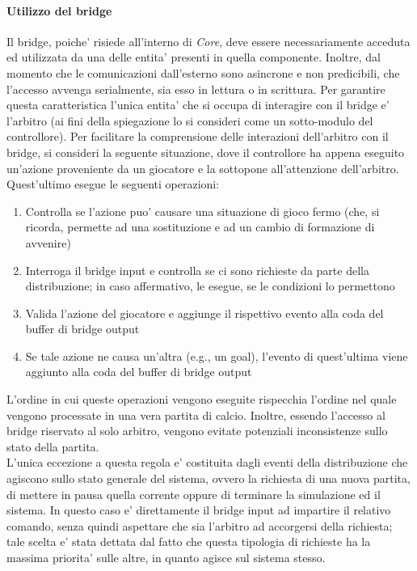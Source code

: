 \paragraph{Utilizzo del bridge}\label{sec:analisi_distribuzione_bridge_utilizzo} Il bridge, poiche' risiede all'interno di \textit{Core}, deve essere necessariamente acceduta ed utilizzata da una delle entita' presenti in quella componente. Inoltre, dal momento che le comunicazioni dall'esterno sono asincrone e non predicibili, che l'accesso avvenga serialmente, sia esso in lettura o in scrittura. Per garantire questa caratteristica l'unica entita' che si occupa di interagire con il bridge e' l'arbitro (ai fini della spiegazione lo si consideri come un sotto-modulo del controllore). Per facilitare la comprensione delle interazioni dell'arbitro con il bridge, si consideri la seguente situazione, dove il controllore ha appena eseguito un'azione proveniente da un giocatore e la sottopone all'attenzione dell'arbitro. Quest'ultimo esegue le seguenti operazioni:

\begin{enumerate}
	\item Controlla se l'azione puo' causare una situazione di gioco fermo (che, si ricorda, permette ad una sostituzione e ad un cambio di formazione di avvenire)
	\item Interroga il bridge input e controlla se ci sono richieste da parte della distribuzione; in caso affermativo, le esegue, se le condizioni lo permettono
	\item Valida l'azione del giocatore e aggiunge il rispettivo evento alla coda del buffer di bridge output
	\item Se tale azione ne causa un'altra (e.g., un goal), l'evento di quest'ultima viene aggiunto alla coda del buffer di bridge output
\end{enumerate}

L'ordine in cui queste operazioni vengono eseguite rispecchia l'ordine nel quale vengono processate in una vera partita di calcio. Inoltre, essendo l'accesso al bridge riservato al solo arbitro, vengono evitate potenziali inconsistenze sullo stato della partita.\\

L'unica eccezione a questa regola e' costituita dagli eventi della distribuzione che agiscono sullo stato generale del sistema, ovvero la richiesta di una nuova partita, di mettere in pausa quella corrente oppure di terminare la simulazione ed il sistema. In questo caso e' direttamente il bridge input ad impartire il relativo comando, senza quindi aspettare che sia l'arbitro ad accorgersi della richiesta; tale scelta e' stata dettata dal fatto che questa tipologia di richieste ha la massima priorita' sulle altre, in quanto agisce sul sistema stesso.

